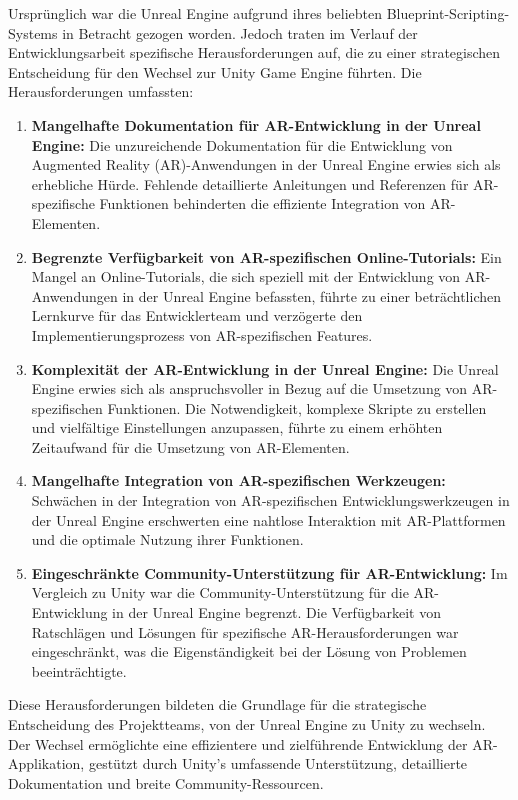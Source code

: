 Ursprünglich war die Unreal Engine aufgrund ihres beliebten Blueprint-Scripting-Systems in Betracht gezogen worden.
Jedoch traten im Verlauf der Entwicklungsarbeit spezifische Herausforderungen auf, die zu einer strategischen
Entscheidung für den Wechsel zur Unity Game Engine führten. Die Herausforderungen umfassten:

\begin{enumerate}
    \item \textbf{Mangelhafte Dokumentation für AR-Entwicklung in der Unreal Engine:} Die unzureichende Dokumentation
    für die Entwicklung von Augmented Reality (AR)-Anwendungen in der Unreal Engine erwies sich als erhebliche Hürde.
    Fehlende detaillierte Anleitungen und Referenzen für AR-spezifische Funktionen behinderten die effiziente Integration von AR-Elementen.
    \item \textbf{Begrenzte Verfügbarkeit von AR-spezifischen Online-Tutorials:} Ein Mangel an Online-Tutorials,
    die sich speziell mit der Entwicklung von AR-Anwendungen in der Unreal Engine befassten, führte zu einer
    beträchtlichen Lernkurve für das Entwicklerteam und verzögerte den Implementierungsprozess von AR-spezifischen Features.
    \item \textbf{Komplexität der AR-Entwicklung in der Unreal Engine:} Die Unreal Engine erwies sich als
    anspruchsvoller in Bezug auf die Umsetzung von AR-spezifischen Funktionen. Die Notwendigkeit, komplexe Skripte zu
    erstellen und vielfältige Einstellungen anzupassen, führte zu einem erhöhten Zeitaufwand für die Umsetzung von AR-Elementen.
    \item \textbf{Mangelhafte Integration von AR-spezifischen Werkzeugen:} Schwächen in der Integration von
    AR-spezifischen Entwicklungswerkzeugen in der Unreal Engine erschwerten eine nahtlose Interaktion mit AR-Plattformen
    und die optimale Nutzung ihrer Funktionen.
    \item \textbf{Eingeschränkte Community-Unterstützung für AR-Entwicklung:} Im Vergleich zu Unity war die Community-Unterstützung
    für die AR-Entwicklung in der Unreal Engine begrenzt. Die Verfügbarkeit von Ratschlägen und Lösungen für spezifische
    AR-Herausforderungen war eingeschränkt, was die Eigenständigkeit bei der Lösung von Problemen beeinträchtigte.
\end{enumerate}

Diese Herausforderungen bildeten die Grundlage für die strategische Entscheidung des Projektteams, von der Unreal Engine
zu Unity zu wechseln. Der Wechsel ermöglichte eine effizientere und zielführende Entwicklung der AR-Applikation,
gestützt durch Unity's umfassende Unterstützung, detaillierte Dokumentation und breite Community-Ressourcen.


